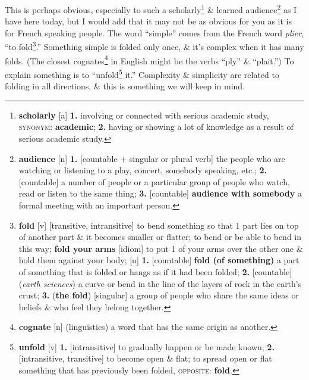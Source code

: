 \documentclass[oneside]{book}
\numberwithin{equation}{section}
\begin{document}
This is perhaps obvious, especially to such a scholarly\footnote{\textbf{scholarly} [a] \textbf{1.} involving or connected with serious academic study, \textsc{synonym}: \textbf{academic}; \textbf{2.} having or showing a lot of knowledge as a result of serious academic study.} \& learned audience\footnote{\textbf{audience} [n] \textbf{1.} [countable $+$ singular or plural verb] the people who are watching or listening to a play, concert, somebody speaking, etc.; \textbf{2.} [countable] a number of people or a particular group of people who watch, read or listen to the same thing; \textbf{3.} [countable] \textbf{audience with somebody} a formal meeting with an important person.} as I have here today, but I would add that it may not be as obvious for you as it is for French speaking people. The word ``simple'' comes from the French word \textit{plier}, ``to fold\footnote{\textbf{fold} [v] [transitive, intransitive] to bend something so that 1 part lies on top of another part \& it becomes smaller or flatter; to bend or be able to bend in this way; \textbf{fold your arms} [idiom] to put 1 of your arms over the other one \& hold them against your body; [n] \textbf{1.} [countable] \textbf{fold (of something)} a part of something that is folded or hangs as if it had been folded; \textbf{2.} [countable] (\textit{earth sciences}) a curve or bend in the line of the layers of rock in the earth's crust; \textbf{3.} (\textbf{the fold}) [singular] a group of people who share the same ideas or beliefs \& who feel they belong together.}.'' Something simple is folded only once, \& it's complex when it has many folds. (The closest cognates\footnote{\textbf{cognate} [n] (linguistics) a word that has the same origin as another.} in English might be the verbs ``ply'' \& ``plait.'') To explain something is to ``unfold\footnote{\textbf{unfold} [v] \textbf{1.} [intransitive] to gradually happen or be made known; \textbf{2.} [intransitive, transitive] to become open \& flat; to spread open or flat something that has previously been folded, \textsc{opposite}: \textbf{fold}.} it.'' Complexity \& simplicity are related to folding in all directions, \& this is something we will keep in mind.
\end{document}
